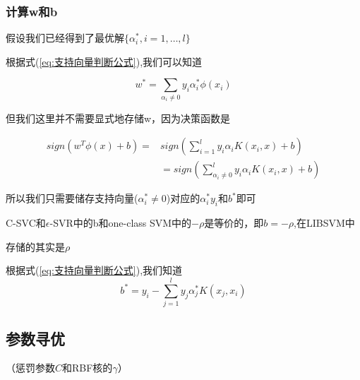 \documentclass[12pt]{ctexart}
\numberwithin{equation}{section} %
\begin{document}
\subsubsection{计算w和b}

假设我们已经得到了最优解$\{ \alpha^*_{i}, i = 1, \ldots, l \}$

根据式(\ref{eq:支持向量判断公式}),我们可以知道


$$w^*=\sum_{\alpha_{i}\neq 0}y_i\alpha_i^*\phi(x_i)$$

但我们这里并不需要显式地存储w，因为决策函数是

\begin{align*}sign(w^T\phi(x)+b)=&sign(\sum_{i=1}^ly_i\alpha_iK(x_i,x)+b)\\
  &=sign(\sum_{\alpha_{i}\neq 0}^ly_i\alpha_iK(x_i,x)+b)
\end{align*}

所以我们只需要储存支持向量($\alpha_i^* \neq 0$)对应的$\alpha_i^*y_i$和$b^*$即可

C-SVC和$\epsilon$-SVR中的b和one-class SVM中的$-\rho$是等价的，即$b=-\rho$,在LIBSVM中

存储的其实是$\rho$

根据式(\ref{eq:支持向量判断公式}),我们知道
$$b^*=y_i-\sum_{j=1}^ly_j\alpha_j^*K(x_j,x_i)$$

\subsection{参数寻优}
（惩罚参数$C$和RBF核的$\gamma$）
\end{document}
